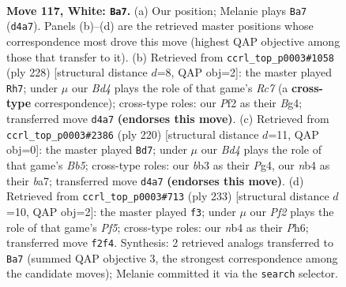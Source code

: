 \documentclass[11pt]{article}
\begin{document}
\clearpage

\begin{figure}[p]\centering
\begin{subfigure}{0.46\textwidth}\centering
\resizebox{\linewidth}{!}{%
\newchessgame
\chessboard[
  setfen={6k1/8/8/7K/1n1B4/1b6/5P2/8 w - - 79 117},
  showmover=false,
  pgfstyle=straightmove, color=movearrow, markmove={d4-a7}
]}
\caption{}
\end{subfigure}\hfill
\begin{subfigure}{0.46\textwidth}\centering
\resizebox{\linewidth}{!}{%
\newchessgame
\chessboard[
  setfen={8/2R5/5bn1/3K4/6B1/8/1k6/8 w - - 69 115},
  showmover=false,
  pgfstyle=straightmove, color=movearrow, markmove={c7-h7}
]}
\caption{}
\end{subfigure}
\\[4pt]
\begin{subfigure}{0.46\textwidth}\centering
\resizebox{\linewidth}{!}{%
\newchessgame
\chessboard[
  setfen={8/b4k2/8/1B6/4KPP1/8/8/8 w - - 15 111},
  showmover=false,
  pgfstyle=straightmove, color=movearrow, markmove={b5-d7}
]}
\caption{}
\end{subfigure}\hfill
\begin{subfigure}{0.46\textwidth}\centering
\resizebox{\linewidth}{!}{%
\newchessgame
\chessboard[
  setfen={8/5B2/3b3p/7P/2K2p2/8/6k1/8 b - - 1 117},
  showmover=false,
  pgfstyle=straightmove, color=movearrow, markmove={f4-f3}
]}
\caption{}
\end{subfigure}
\caption{\textbf{Move 117, White: \texttt{Ba7}.} (a) Our position; Melanie plays \texttt{Ba7} (\texttt{d4a7}). Panels (b)--(d) are the retrieved master positions whose correspondence most drove this move (highest QAP objective among those that transfer to it). (b) Retrieved from \texttt{ccrl\_top\_p0003\#1058} (ply 228) [structural distance $d$=8, QAP obj=2]: the master played \texttt{Rh7}; under $\mu$ our \emph{Bd4} plays the role of that game's \emph{Rc7} (a \textbf{cross-type} correspondence); cross-type roles: our \emph{P}f2 as their \emph{B}g4; transferred move \texttt{d4a7} \textbf{(endorses this move)}. (c) Retrieved from \texttt{ccrl\_top\_p0003\#2386} (ply 220) [structural distance $d$=11, QAP obj=0]: the master played \texttt{Bd7}; under $\mu$ our \emph{Bd4} plays the role of that game's \emph{Bb5}; cross-type roles: our \emph{b}b3 as their \emph{P}g4, our \emph{n}b4 as their \emph{b}a7; transferred move \texttt{d4a7} \textbf{(endorses this move)}. (d) Retrieved from \texttt{ccrl\_top\_p0003\#713} (ply 233) [structural distance $d$=10, QAP obj=2]: the master played \texttt{f3}; under $\mu$ our \emph{Pf2} plays the role of that game's \emph{Pf5}; cross-type roles: our \emph{n}b4 as their \emph{P}h6; transferred move \texttt{f2f4}. Synthesis: 2 retrieved analogs transferred to \texttt{Ba7} (summed QAP objective 3, the strongest correspondence among the candidate moves); Melanie committed it via the \texttt{search} selector.}
\label{fig:thought-m232}
\end{figure}
\end{document}

